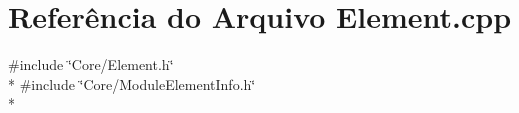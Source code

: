 \section{Referência do Arquivo Element.\+cpp}
\label{_element_8cpp}
{\ttfamily \#include \char`\"{}Core/\+Element.\+h\char`\"{}}\\*
{\ttfamily \#include \char`\"{}Core/\+Module\+Element\+Info.\+h\char`\"{}}\\*
